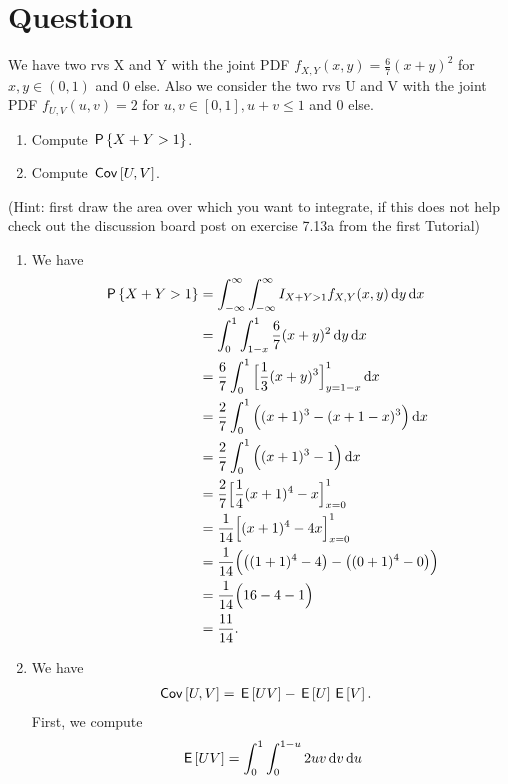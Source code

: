 \section*{Question}

\begin{exercise}
We have two rvs X and Y with the joint PDF $f_{X,Y}(x,y) = \frac{6}{7}(x+y)^2$ for $x, y \in (0,1)$ and 0 else. Also we consider the two rvs U and V with the joint PDF $f_{U,V}(u,v) = 2$ for $u, v \in [0,1], u+v \leq 1$ and 0 else.
\begin{enumerate}
\item Compute $\P{X+Y>1}$.
\item Compute $\cov{U,V}$.
\end{enumerate}
(Hint: first draw the area over which you want to integrate, if this does not help check out the discussion board post on exercise 7.13a from the first Tutorial)
\begin{solution}
\begin{enumerate}
    \item We have
    \begin{align}
        \P{X+Y>1} &= \int_{-\infty}^\infty \int_{-\infty}^\infty I_{X + Y > 1} f_{X,Y}(x,y) \d y \d x \\
        &= \int_{0}^1 \int_{1-x}^1  \frac{6}{7}(x+y)^2 \d y \d x \\
        &=\frac{6}{7} \int_{0}^1 \Big[\frac{1}{3} (x+y)^3 \Big]_{y=1-x}^1 \d x \\
        &=\frac{2}{7} \int_{0}^1 \Big( (x+1)^3 - (x + 1 - x)^3 \Big) \d x \\
        &=\frac{2}{7} \int_{0}^1 \Big( (x+1)^3 - 1 \Big) \d x \\
        &=\frac{2}{7} \Big[ \frac{1}{4}(x+1)^4 - x \Big]_{x=0}^1 \\
        &=\frac{1}{14}\Big[ (x+1)^4 - 4x \Big]_{x=0}^1 \\
        &=\frac{1}{14} \Big( \big( (1+1)^4 - 4\big) - \big((0+1)^4 - 0 \big) \Big) \\
        &=\frac{1}{14} \Big( 16 - 4 - 1 \Big) \\
        &= \frac{11}{14}.
    \end{align}
    \item We have
    \begin{align}
        \cov{U,V} &= \E{UV} - \E{U}\E{V}.
    \end{align}
    First, we compute
    \begin{align}
        \E{UV} &= \int_0^1 \int_0^{1-u} 2 uv \d v \d u \\

\end{align}
\end{enumerate}
\end{solution}
\end{exercise}
